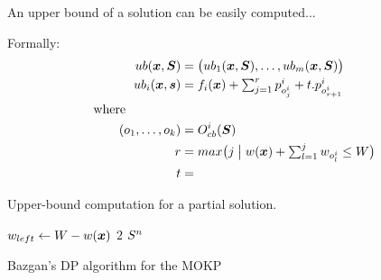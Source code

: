 An upper bound of a solution can be easily computed...

Formally:
\begin{align*}
    ub(\boldsymbol{x}, \boldsymbol{S}) &= \big(ub_1(\boldsymbol{x}, \boldsymbol{S}), \ldots, ub_m(\boldsymbol{x}, \boldsymbol{S})\big) \\
    ub_i(\boldsymbol{x}, \boldsymbol{s}) &= f_i(\boldsymbol{x}) + \textstyle\sum^r_{j=1} p^i_{o^i_j} + t.p^i_{o^i_{r+1}}\\
  \text{where} \phantom{mmmmm} \\
    (o_1, \ldots, o_k) &= O_{cb}^i(\boldsymbol{S}) \\
    r &= max\big( j \;\big|\; w(\boldsymbol{x}) + \textstyle\sum_{l = 1}^j w_{o^i_l} \leq W \big) \\
    t &= \textstyle
\end{align*}

\begin{algorithm}
  \caption{Upper-bound computation for a partial solution.}
  \label{alg:up}
  \begin{algorithmic}[1]
      \State $w_{left} \gets W - w(\boldsymbol{x})$
        \State $2$
      \EndWhile
      \State \Return $S^n$
    \EndFunction
  \end{algorithmic}
\end{algorithm}


\begin{algorithm}
  \caption{Bazgan's DP algorithm for the MOKP}
  \label{alg:bazgan}
  
\end{algorithm}


